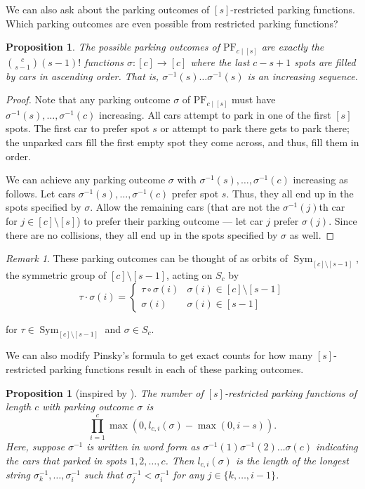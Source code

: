 \documentclass[12 pt]{amsart}
\newtheorem{proposition}[theorem]{Proposition}
\theoremstyle{definition} %
\theoremstyle{remark} %
\newtheorem{remark}[theorem]{Remark}
\begin{document}
We can also ask about the parking outcomes of $[s]$-restricted parking functions. Which parking outcomes are even possible from restricted parking functions?

\begin{proposition}
	The possible parking outcomes of $\mathrm{PF}_{c \mid [s]}$ are exactly the $\binom{c}{s - 1}(s - 1)!$ functions $\sigma : [c] \to [c]$ where the last $c - s + 1$ spots are filled by cars in ascending order. That is, $\sigma^{-1}(s) \dots \sigma^{-1}(s)$ is an increasing sequence.
\end{proposition}

\begin{proof}
	Note that any parking outcome $\sigma$ of $\mathrm{PF}_{c \mid [s]}$ must have $\sigma^{-1}(s), \dots, \sigma^{-1}(c)$ increasing. All cars attempt to park in one of the first $[s]$ spots. The first car to prefer spot $s$ or attempt to park there gets to park there; the unparked cars fill the first empty spot they come across, and thus, fill them in order.

	We can achieve any parking outcome $\sigma$ with $\sigma^{-1}(s), \dots, \sigma^{-1}(c)$ increasing as follows. Let cars $\sigma^{-1}(s), \dots, \sigma^{-1}(c)$ prefer spot $s$. Thus, they all end up in the spots specified by $\sigma$. Allow the remaining cars (that are not the $\sigma^{-1}(j)$th car for $j \in [c] \setminus [s]$) to prefer their parking outcome --- let car $j$ prefer $\sigma(j)$. Since there are no collisions, they all end up in the spots specified by $\sigma$ as well.
\end{proof}

\begin{remark}
	These parking outcomes can be thought of as orbits of $\operatorname{Sym}_{[c] \setminus [s - 1]}$, the symmetric group of $[c] \setminus [s - 1]$, acting on $S_{c}$ by 
	\[
		\tau \cdot \sigma(i) = \begin{cases}
			\tau \circ \sigma(i) & \sigma(i) \in [c] \setminus [s - 1] \\
			\sigma(i) & \sigma(i) \in [s - 1]
		\end{cases}
	\]
	
	for $\tau \in \operatorname{Sym}_{[c] \setminus [s - 1]}$ and $\sigma \in S_{c}$.
\end{remark}

We can also modify Pinsky's formula to get exact counts for how many $[s]$-restricted parking functions result in each of these parking outcomes.

\begin{proposition}[inspired by \cite{pinsky-2024}]
	The number of $[s]$-restricted parking functions of length $c$ with parking outcome $\sigma$ is
	\[
		\prod_{i = 1}^c \max(0, l_{c, i}(\sigma) - \max(0, i - s)).
	\]
	Here, suppose $\sigma^{-1}$ is written in word form as $\sigma^{-1}(1) \sigma^{-1}(2) \dots \sigma(c)$ indicating the cars that parked in spots $1, 2, \dots, c$. Then $l_{c, i}(\sigma)$ is the length of the longest string $\sigma^{-1}_{k}, \dots, \sigma_{i}^{-1}$ such that $\sigma_{j}^{-1} < \sigma^{-1}_{i}$ for any $j \in \{ k, \dots, i - 1 \}$.
\end{proposition}
\end{document}
